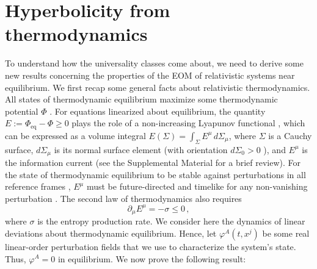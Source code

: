 \documentclass[aps,prl,singlecolumn,nofootinbib]{revtex4-2}
\theoremstyle{definition}
\theoremstyle{theorem}
\newtheorem{theorem}{Theorem}
\newcommand{\md}[1]{{\color{blue}#1}}
\begin{document}

\section{Hyperbolicity from thermodynamics}
To understand how the universality classes come about, we need to derive some new results concerning the properties of the EOM of relativistic systems near equilibrium. We first recap some general facts about relativistic thermodynamics. All states of thermodynamic equilibrium maximize some thermodynamic potential $\Phi$ \cite{Stuekelberg1962,Israel_2009_inbook,Grmela1997,
huang_book,landau5,GavassinoTermometri}. For equations linearized about equilibrium, the quantity $E:=\Phi_\text{eq}-\Phi \geq 0$ plays the role of a non-increasing Lyapunov functional \cite{GavassinoGibbs2021}, which can be expressed as a volume integral $E(\Sigma) = \int_\Sigma E^\mu \, d\Sigma_\mu$, 
where $\Sigma$ is a Cauchy surface, $d\Sigma_\mu$ is its normal surface element (with orientation $d\Sigma_0>0$ \cite{MTW_book}), and $E^\mu$ is the information current \cite{GavassinoCausality2021} (see the Supplemental Material for a brief review). For the state of thermodynamic equilibrium to be stable against perturbations in all reference frames \cite{GavassinoSuperluminal2021,GavassinoBounds2023}, $E^\mu$ must be future-directed and timelike for any non-vanishing perturbation \cite{GavassinoCausality2021}. The second law of thermodynamics also requires 
\begin{equation}\label{Emu}
\partial_\mu E^\mu = -\sigma \leq 0 \, ,
\end{equation}
where $\sigma$ is the entropy production rate. We consider here the dynamics of linear deviations about thermodynamic equilibrium. Hence, let $\varphi^A(t,x^j)$  be some real linear-order perturbation fields that we use to characterize the system's state. Thus, $\varphi^A=0$ in equilibrium.  We now prove the following result: 
\end{document}
